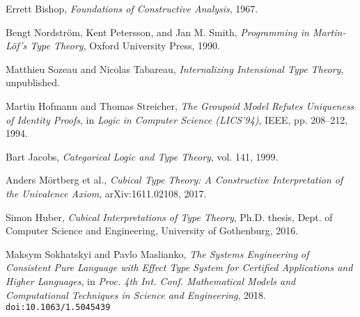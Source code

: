 \documentclass{article}
\begin{document}
\begin{thebibliography}{99}
Errett Bishop,
\textit{Foundations of Constructive Analysis},
1967.

Bengt Nordström, Kent Petersson, and Jan M. Smith,
\textit{Programming in Martin-Löf’s Type Theory},
Oxford University Press, 1990.

Matthieu Sozeau and Nicolas Tabareau,
\textit{Internalizing Intensional Type Theory},
unpublished.

Martin Hofmann and Thomas Streicher,
\textit{The Groupoid Model Refutes Uniqueness of Identity Proofs},
in \textit{Logic in Computer Science (LICS'94)}, IEEE, pp. 208–212, 1994.

Bart Jacobs,
\textit{Categorical Logic and Type Theory},
vol. 141, 1999.

Anders Mörtberg et al.,
\textit{Cubical Type Theory: A Constructive Interpretation of the Univalence Axiom},
arXiv:1611.02108, 2017.

Simon Huber,
\textit{Cubical Interpretations of Type Theory},
Ph.D. thesis, Dept. of Computer Science and Engineering, University of Gothenburg, 2016.

Maksym Sokhatskyi and Pavlo Maslianko,
\textit{The Systems Engineering of Consistent Pure Language with Effect Type System for Certified Applications and Higher Languages},
in \textit{Proc. 4th Int. Conf. Mathematical Models and Computational Techniques in Science and Engineering},
2018.
\texttt{doi:10.1063/1.5045439}
\end{thebibliography}
\end{document}
